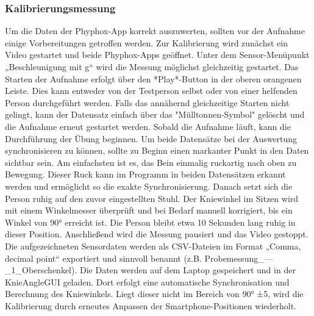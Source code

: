 \subsubsection{Kalibrierungsmessung}
\noindent Um die Daten der Phyphox-App korrekt auszuwerten, sollten vor der Aufnahme einige Vorbereitungen getroffen werden. Zur Kalibrierung wird zunächst ein Video gestartet und beide Phyphox-Apps geöffnet. Unter dem Sensor-Menüpunkt „Beschleunigung mit g“ wird die Messung möglichst gleichzeitig gestartet. Das Starten der Aufnahme erfolgt über den *Play*-Button in der oberen orangenen Leiste. Dies kann entweder von der Testperson selbst oder von einer helfenden Person durchgeführt werden. Falls das annähernd gleichzeitige Starten nicht gelingt, kann der Datensatz einfach über das "Mülltonnen-Symbol" gelöscht und die Aufnahme erneut gestartet werden. Sobald die Aufnahme läuft, kann die Durchführung der Übung beginnen.
\noindent Um beide Datensätze bei der Auswertung synchronisieren  zu können, sollte zu Beginn einen markanter Punkt in den Daten sichtbar sein. Am einfachsten ist es, das Bein einmalig ruckartig nach oben zu Bewegung. Dieser Ruck kann im Programm in beiden Datensätzen erkannt werden und ermöglicht so die exakte Synchronisierung. Danach setzt sich die Person ruhig auf den zuvor eingestellten Stuhl. 
\noindent Der Kniewinkel im Sitzen wird mit einem Winkelmesser überprüft und bei Bedarf manuell korrigiert, bis ein Winkel von 90° erreicht ist. Die Person bleibt etwa 10 Sekunden lang ruhig in dieser Position. Anschließend wird die Messung pausiert und das Video gestoppt.
\noindent Die aufgezeichneten Sensordaten werden als CSV-Dateien im Format „Comma, decimal point“ exportiert und sinnvoll benannt (z.B. Probemessung\_---\_1\_Oberschenkel). Die Daten werden auf dem Laptop gespeichert und in der KnieAngleGUI geladen. Dort erfolgt eine automatische Synchronisation und Berechnung des Kniewinkels. Liegt dieser nicht im Bereich von 90° ±5, wird die Kalibrierung durch erneutes Anpassen der Smartphone-Positionen wiederholt.

